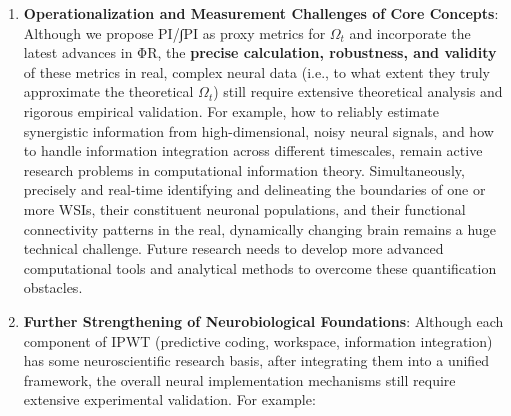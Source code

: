 \documentclass[
  a4paper]{article}
\begin{document}
\begin{enumerate}
\def\labelenumi{\arabic{enumi}.}
\item
  \textbf{Operationalization and Measurement Challenges of Core
  Concepts}: Although we propose PI/∫PI as proxy metrics for
  \(\Omega_t\) and incorporate the latest advances in ΦR, the
  \textbf{precise calculation, robustness, and validity} of these
  metrics in real, complex neural data (i.e., to what extent they truly
  approximate the theoretical \(\Omega_t\)) still require extensive
  theoretical analysis and rigorous empirical validation. For example,
  how to reliably estimate synergistic information from
  high-dimensional, noisy neural signals, and how to handle information
  integration across different timescales, remain active research
  problems in computational information theory. Simultaneously,
  precisely and real-time identifying and delineating the boundaries of
  one or more WSIs, their constituent neuronal populations, and their
  functional connectivity patterns in the real, dynamically changing
  brain remains a huge technical challenge. Future research needs to
  develop more advanced computational tools and analytical methods to
  overcome these quantification obstacles.
\item
  \textbf{Further Strengthening of Neurobiological Foundations}:
  Although each component of IPWT (predictive coding, workspace,
  information integration) has some neuroscientific research basis,
  after integrating them into a unified framework, the overall neural
  implementation mechanisms still require extensive experimental
  validation. For example:


\end{enumerate}
\end{document}

